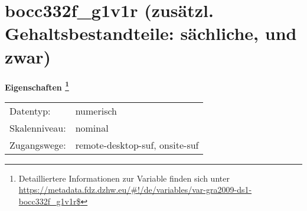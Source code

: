 
    \setcounter{footnote}{0}

    \vspace*{-1.8cm}
	\section{bocc332f\_g1v1r (zusätzl. Gehaltsbestandteile: sächliche, und zwar)}
	\label{section:bocc332f_g1v1r}



    \vspace*{0.5cm}
    \noindent\textbf{Eigenschaften
	\footnote{Detailliertere Informationen zur Variable finden sich unter
		\url{https://metadata.fdz.dzhw.eu/\#!/de/variables/var-gra2009-ds1-bocc332f_g1v1r$}}}\\
	\begin{tabularx}{\hsize}{@{}lX}
	Datentyp: & numerisch \\
	Skalenniveau: & nominal \\
	Zugangswege: &
	  remote-desktop-suf, 
	  onsite-suf
 \\
    \end{tabularx}



